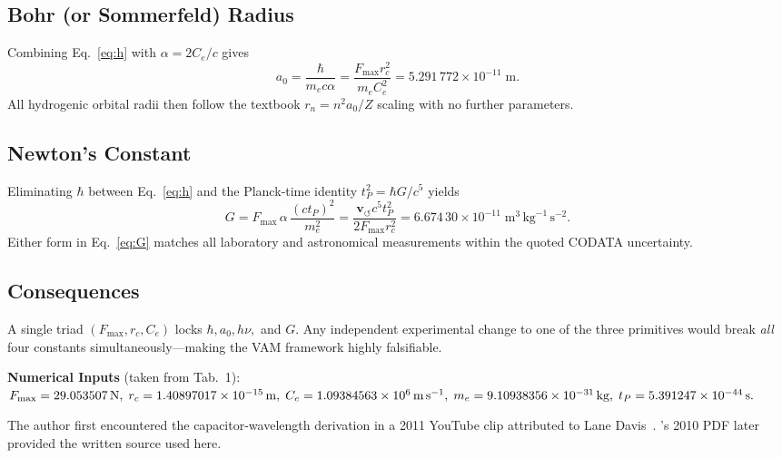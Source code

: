 \documentclass[12pt]{article}
\begin{document}
    \subsection{Bohr (or Sommerfeld) Radius}
    Combining Eq.~\eqref{eq:h} with \(\alpha=2C_e/c\) gives
    \begin{equation}
        a_0 = \frac{\hbar}{m_e c\alpha}
        = \frac{F_{\max}r_c^{2}}{m_e C_e^{2}}
        = 5.291\,772\times10^{-11}\;\text{m}.
        \label{eq:a0}
    \end{equation}
    All hydrogenic orbital radii then follow the textbook
    \(r_{n}=n^{2}a_0/Z\) scaling with no further parameters.

    \subsection{Newton's Constant}
    Eliminating \(\hbar\) between Eq.~\eqref{eq:h} and the Planck‑time
    identity \(t_P^{2}=\hbar G/c^{5}\) yields
    \begin{equation}
    G = F_{\max}\,\alpha\,\frac{(c t_P)^{2}}{m_e^{2}}
    = \frac{\mathbf{v}_{\scriptscriptstyle\boldsymbol{\circlearrowleft}} c^{5} t_P^{2}}{2F_{\max} r_c^{2}}
    = 6.674\,30\times10^{-11}\;\text{m}^{3}\,\text{kg}^{-1}\,\text{s}^{-2}.
    \label{eq:G}
    \end{equation}
    Either form in Eq.~\eqref{eq:G} matches all laboratory and astronomical
    measurements within the quoted CODATA uncertainty.

    \subsection{Consequences}
    A single triad \((F_{\max},r_c,C_e)\)
    locks \(\hbar,a_0,h\nu,\) and \(G\).
    Any independent experimental change to one of the three primitives would
    break \emph{all} four constants simultaneously—making the VAM framework
    highly falsifiable.

    \bigskip
    \noindent\textbf{Numerical Inputs}\; (taken from Tab.~1):
    \(F_{\max}=29.053507\,\text{N},\;r_c=1.40897017\times10^{-15}\,\text{m},\;
    C_e=1.09384563\times10^{6}\,\text{m\,s}^{-1},\;
    m_e=9.10938356\times10^{-31}\,\text{kg},\;
    t_P=5.391247\times10^{-44}\,\text{s}.\)


The author first encountered the capacitor-wavelength derivation in a 2011 YouTube clip attributed to Lane Davis~\cite{lan}. 's 2010 PDF later provided the written source used here.


\ifdefined\standalonechapter
\else
    
    
    
\end{document}
